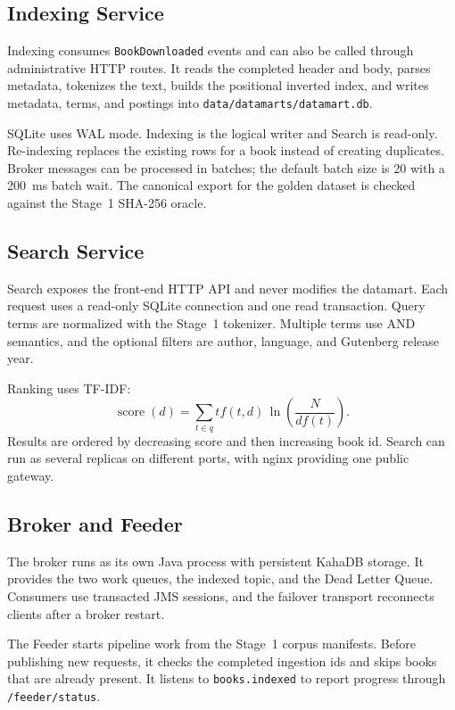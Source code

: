 \documentclass[12pt,a4paper]{article}
\begin{document}
\subsection{Indexing Service}

Indexing consumes \texttt{BookDownloaded} events and can also be called through administrative
HTTP routes. It reads the completed header and body, parses metadata, tokenizes the text, builds the
positional inverted index, and writes metadata, terms, and postings into
\texttt{data/datamarts/datamart.db}.

SQLite uses WAL mode. Indexing is the logical writer and Search is read-only. Re-indexing replaces
the existing rows for a book instead of creating duplicates. Broker messages can be processed in
batches; the default batch size is 20 with a 200~ms batch wait. The canonical export for the golden
dataset is checked against the Stage~1 SHA-256 oracle.

\subsection{Search Service}

Search exposes the front-end HTTP API and never modifies the datamart. Each request uses a
read-only SQLite connection and one read transaction. Query terms are normalized with the Stage~1
tokenizer. Multiple terms use AND semantics, and the optional filters are author, language, and
Gutenberg release year.

Ranking uses TF-IDF:
\[
    \operatorname{score}(d)=\sum_{t \in q} tf(t,d)\,\ln\!\left(\frac{N}{df(t)}\right).
\]
Results are ordered by decreasing score and then increasing book id. Search can run as several
replicas on different ports, with nginx providing one public gateway.

\subsection{Broker and Feeder}

The broker runs as its own Java process with persistent KahaDB storage. It provides the two work
queues, the indexed topic, and the Dead Letter Queue. Consumers use transacted JMS sessions, and
the failover transport reconnects clients after a broker restart.

The Feeder starts pipeline work from the Stage~1 corpus manifests. Before publishing new requests,
it checks the completed ingestion ids and skips books that are already present. It listens to
\texttt{books.indexed} to report progress through \texttt{/feeder/status}.
\end{document}
